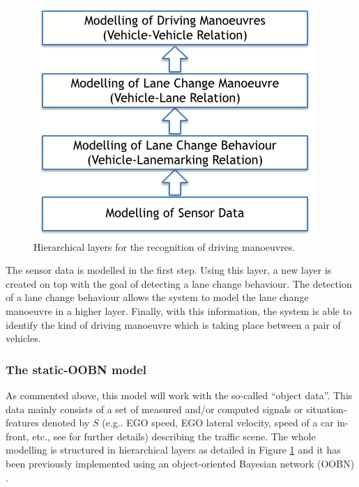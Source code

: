\begin{figure}
\begin{center}
\includegraphics[scale=0.58]{./figures/DaimlerHierarchicalModelling}
\caption{\label{Figure:DaimlerHierarchicalModelling} Hierarchical layers for the recognition of driving manoeuvres.}
\end{center}
\end{figure}

The sensor data is modelled in the first step. Using this layer, a new layer is created on top with the goal of detecting a lane change behaviour. The detection of a lane change behaviour allows the system to model the lane change manoeuvre in a higher layer. Finally, with this information, the system is able to identify the kind of driving manoeuvre which is taking place between a pair of vehicles. 



\subsubsection{The static-OOBN model}

As commented above, this model will work with the so-called ``object data''. This data mainly consists of a set of measured and/or computed signals or situation-features denoted by $S$ (e.g.. EGO speed, EGO lateral velocity, speed of a car in-front, etc., see \cite{kasper2012object} for further details) describing the traffic scene. The whole modelling is structured in hierarchical layers as detailed in Figure \ref{Figure:DaimlerHierarchicalModelling} and it has been previously implemented \cite{kasper2012object} using an object-oriented Bayesian network (OOBN) \cite{koller1997object}. 


